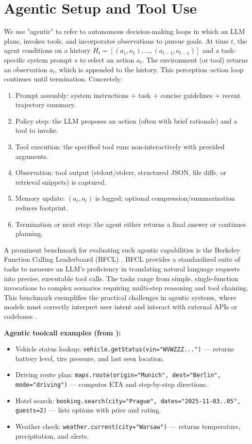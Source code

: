 \section{Agentic Setup and Tool Use}

We use "agentic" to refer to autonomous decision-making loops in which an LLM plans, invokes tools, and incorporates observations to pursue goals. 
At time \(t\), the agent conditions on a history \(H_t = [(a_1,o_1),\dots,(a_{t-1},o_{t-1})]\) and a task-specific system prompt \(s\) to select an action \(a_t\). 
The environment (or tool) returns an observation \(o_t\), which is appended to the history. This perception–action loop continues until termination. Concretely:
\begin{enumerate}
  \item Prompt assembly: system instructions + task + concise guidelines + recent trajectory summary.
  \item Policy step: the LLM proposes an action (often with brief rationale) and a tool to invoke.
  \item Tool execution: the specified tool runs non-interactively with provided arguments.
  \item Observation: tool output (stdout/stderr, structured JSON, file diffs, or retrieval snippets) is captured.
  \item Memory update: \((a_t, o_t)\) is logged; optional compression/summarization reduces footprint.
  \item Termination or next step: the agent either returns a final answer or continues planning.
\end{enumerate}


A prominent benchmark for evaluating such agentic capabilities is the Berkeley Function Calling Leaderboard (BFCL) \cite{patil2025bfcl}. 
BFCL provides a standardized suite of tasks to measure an LLM's proficiency in translating natural language requests into precise, executable tool calls. 
The tasks range from simple, single-function invocations to complex scenarios requiring multi-step reasoning and tool chaining. 
This benchmark exemplifies the practical challenges in agentic systems, where models must correctly interpret user intent and interact with external APIs or codebases \cite{patil2025bfcl}.


\textbf{Agentic toolcall examples (from \cite{patil2025bfcl}):}
\begin{itemize}
  \item Vehicle status lookup: \texttt{vehicle.getStatus(vin="WVWZZZ...")} — returns battery level, tire pressure, and last seen location.
  \item Driving route plan: \texttt{maps.route(origin="Munich", dest="Berlin", mode="driving")} — computes ETA and step-by-step directions.
  \item Hotel search: \texttt{booking.search(city="Prague", dates="2025-11-03..05", guests=2)} — lists options with price and rating.
  \item Weather check: \texttt{weather.current(city="Warsaw")} — returns temperature, precipitation, and alerts.
\end{itemize}

